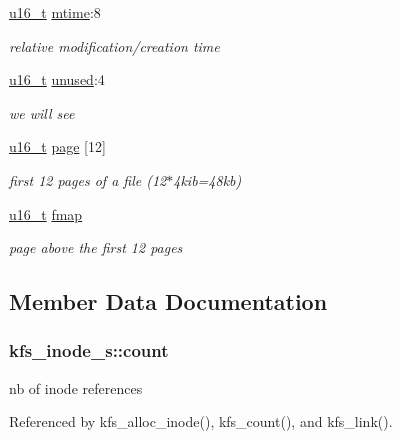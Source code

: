 \begin{DoxyCompactItemize}
\hyperlink{kfs_8c_afc6499c1f28697aa3bfc2804d496fd11}{u16\-\_\-t} \hyperlink{structkfs__inode__s_a575e296191f8d2444a26f90d58e155e6}{mtime}\-:8
\begin{DoxyCompactList}\small\item\em relative modification/creation time \end{DoxyCompactList}\item 
\hyperlink{kfs_8c_afc6499c1f28697aa3bfc2804d496fd11}{u16\-\_\-t} \hyperlink{structkfs__inode__s_a53daf3151e8bd7995cb4f10a9b2510c0}{unused}\-:4
\begin{DoxyCompactList}\small\item\em we will see \end{DoxyCompactList}\item 
\hyperlink{kfs_8c_afc6499c1f28697aa3bfc2804d496fd11}{u16\-\_\-t} \hyperlink{structkfs__inode__s_aea74f0e1495f40cf25e36f8963b84e8b}{page} \mbox{[}12\mbox{]}
\begin{DoxyCompactList}\small\item\em first 12 pages of a file (12$\ast$4kib=48kb) \end{DoxyCompactList}\item 
\hyperlink{kfs_8c_afc6499c1f28697aa3bfc2804d496fd11}{u16\-\_\-t} \hyperlink{structkfs__inode__s_a6a491f8ad9c0ea78d30421be44931e9b}{fmap}
\begin{DoxyCompactList}\small\item\em page above the first 12 pages \end{DoxyCompactList}\end{DoxyCompactItemize}


\subsection{Member Data Documentation}
\hypertarget{structkfs__inode__s_ae5ea15e9504973dc519f2ceca209a3d8}{
\subsubsection[{count}]{ kfs\-\_\-inode\-\_\-s\-::count}}\label{structkfs__inode__s_ae5ea15e9504973dc519f2ceca209a3d8}


nb of inode references 



Referenced by kfs\-\_\-alloc\-\_\-inode(), kfs\-\_\-count(), and kfs\-\_\-link().

